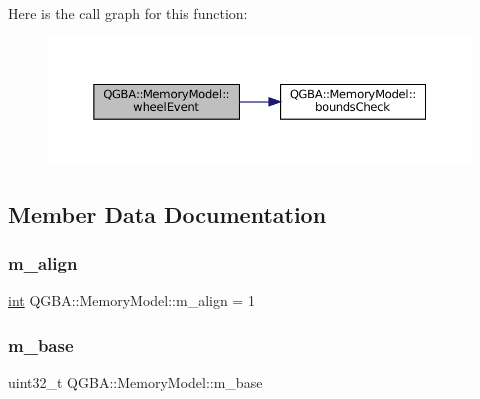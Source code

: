 Here is the call graph for this function\+:
\nopagebreak
\begin{figure}[H]
\begin{center}
\leavevmode
\includegraphics[width=350pt]{class_q_g_b_a_1_1_memory_model_aec8b8664b330d0b1aa19548620b0d2e4_cgraph}
\end{center}
\end{figure}


\subsection{Member Data Documentation}
\mbox{\label{class_q_g_b_a_1_1_memory_model_a5b51991da86ac0ff576888a73f7e726d}} 
\subsubsection{\texorpdfstring{m\+\_\+align}{m\_align}}
{\footnotesize\ttfamily \mbox{\hyperlink{ioapi_8h_a787fa3cf048117ba7123753c1e74fcd6}{int}} Q\+G\+B\+A\+::\+Memory\+Model\+::m\+\_\+align = 1\hspace{0.3cm}{\ttfamily [private]}}

\mbox{\label{class_q_g_b_a_1_1_memory_model_a4c09c6927ef4997d88511685c6553385}} 
\subsubsection{\texorpdfstring{m\+\_\+base}{m\_base}}
{\footnotesize\ttfamily uint32\+\_\+t Q\+G\+B\+A\+::\+Memory\+Model\+::m\+\_\+base\hspace{0.3cm}{\ttfamily [private]}}

